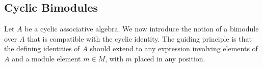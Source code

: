 \documentclass[pdflatex,sn-mathphys-num]{sn-jnl}%
\theoremstyle{thmstyleone}%
\newtheorem{remark}{Remark}[section]
\theoremstyle{thmstyletwo}%
\theoremstyle{thmstylethree}%
\begin{document}

\subsection{Cyclic Bimodules}

Let $A$ be a cyclic associative algebra. We now introduce the notion of a bimodule over $A$ that is compatible with the cyclic identity. The guiding principle is that the defining identities of $A$ should extend to any expression involving elements of $A$ and a module element $m \in M$, with $m$ placed in any position.
\end{document}
